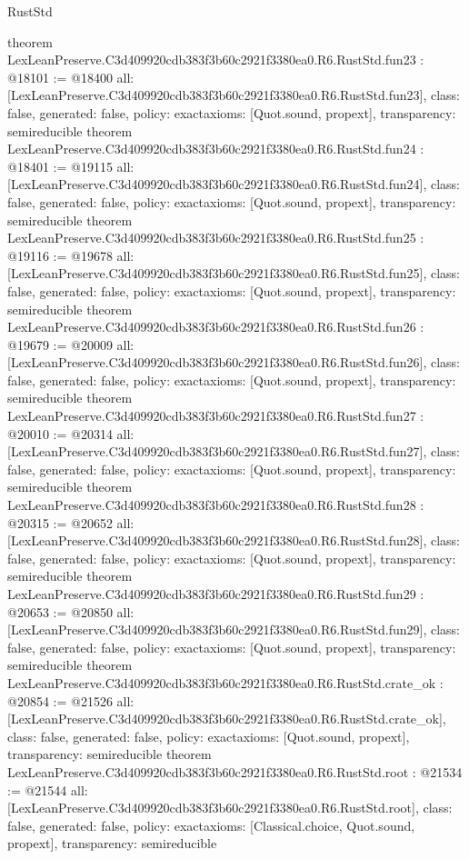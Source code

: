 \begin{lexlean}{RustStd}
\begin{coremodule}
{}
theorem LexLeanPreserve.C3d409920cdb383f3b60c2921f3380ea0.R6.RustStd.fun23 : @18101 := @18400 {
  all: [LexLeanPreserve.C3d409920cdb383f3b60c2921f3380ea0.R6.RustStd.fun23],
  class: false,
  generated: false,
  policy: exact{axioms: [Quot.sound, propext]},
  transparency: semireducible
}
theorem LexLeanPreserve.C3d409920cdb383f3b60c2921f3380ea0.R6.RustStd.fun24 : @18401 := @19115 {
  all: [LexLeanPreserve.C3d409920cdb383f3b60c2921f3380ea0.R6.RustStd.fun24],
  class: false,
  generated: false,
  policy: exact{axioms: [Quot.sound, propext]},
  transparency: semireducible
}
theorem LexLeanPreserve.C3d409920cdb383f3b60c2921f3380ea0.R6.RustStd.fun25 : @19116 := @19678 {
  all: [LexLeanPreserve.C3d409920cdb383f3b60c2921f3380ea0.R6.RustStd.fun25],
  class: false,
  generated: false,
  policy: exact{axioms: [Quot.sound, propext]},
  transparency: semireducible
}
theorem LexLeanPreserve.C3d409920cdb383f3b60c2921f3380ea0.R6.RustStd.fun26 : @19679 := @20009 {
  all: [LexLeanPreserve.C3d409920cdb383f3b60c2921f3380ea0.R6.RustStd.fun26],
  class: false,
  generated: false,
  policy: exact{axioms: [Quot.sound, propext]},
  transparency: semireducible
}
theorem LexLeanPreserve.C3d409920cdb383f3b60c2921f3380ea0.R6.RustStd.fun27 : @20010 := @20314 {
  all: [LexLeanPreserve.C3d409920cdb383f3b60c2921f3380ea0.R6.RustStd.fun27],
  class: false,
  generated: false,
  policy: exact{axioms: [Quot.sound, propext]},
  transparency: semireducible
}
theorem LexLeanPreserve.C3d409920cdb383f3b60c2921f3380ea0.R6.RustStd.fun28 : @20315 := @20652 {
  all: [LexLeanPreserve.C3d409920cdb383f3b60c2921f3380ea0.R6.RustStd.fun28],
  class: false,
  generated: false,
  policy: exact{axioms: [Quot.sound, propext]},
  transparency: semireducible
}
theorem LexLeanPreserve.C3d409920cdb383f3b60c2921f3380ea0.R6.RustStd.fun29 : @20653 := @20850 {
  all: [LexLeanPreserve.C3d409920cdb383f3b60c2921f3380ea0.R6.RustStd.fun29],
  class: false,
  generated: false,
  policy: exact{axioms: [Quot.sound, propext]},
  transparency: semireducible
}
theorem LexLeanPreserve.C3d409920cdb383f3b60c2921f3380ea0.R6.RustStd.crate_ok : @20854 := @21526 {
  all: [LexLeanPreserve.C3d409920cdb383f3b60c2921f3380ea0.R6.RustStd.crate_ok],
  class: false,
  generated: false,
  policy: exact{axioms: [Quot.sound, propext]},
  transparency: semireducible
}
theorem LexLeanPreserve.C3d409920cdb383f3b60c2921f3380ea0.R6.RustStd.root : @21534 := @21544 {
  all: [LexLeanPreserve.C3d409920cdb383f3b60c2921f3380ea0.R6.RustStd.root],
  class: false,
  generated: false,
  policy: exact{axioms: [Classical.choice, Quot.sound, propext]},
  transparency: semireducible
}


\end{coremodule}
\end{lexlean}
